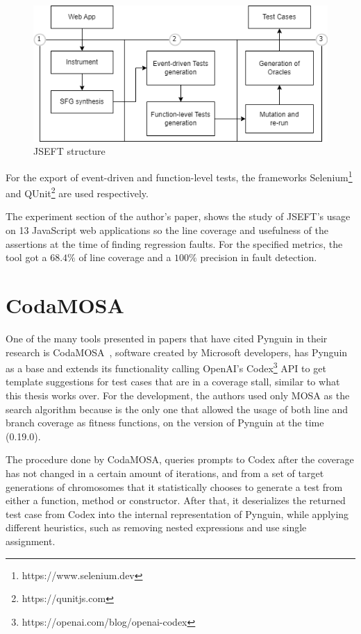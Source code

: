 \documentclass[%
  chapterprefix=false,%
  open=right,%
  twoside=true,%
  paper=a4,%
  logofile={Figures/logo.png},%
  thesistype=master,%
  UKenglish,%
]{se2thesis}
\begin{document}
\begin{figure}[tb]
  \centering 
  \includegraphics[width=.99\textwidth]{Figures/jseft2.png}
  \caption{JSEFT structure}\label{fig:jseft}
\end{figure}

For the export of event-driven and function-level tests, the frameworks Selenium\footnote{https://www.selenium.dev} and QUnit\footnote{https://qunitjs.com} are used respectively.

The experiment section of the author's paper, shows the study of JSEFT's usage on 13 JavaScript web applications so the line coverage and usefulness of the assertions at the time of finding regression faults.
For the specified metrics, the tool got a \(68.4\%\) of line coverage and a \(100\%\) precision in fault detection.

\section{CodaMOSA}

One of the many tools presented in papers that have cited Pynguin in their research is CodaMOSA~\cite{DBLP:conf/icse/LemieuxILS23}, software created by Microsoft developers, has Pynguin as a base and extends its functionality calling OpenAI's Codex\footnote{https://openai.com/blog/openai-codex} API to get template suggestions for test cases that are in a coverage stall, similar to what this thesis works over.
For the development, the authors used only MOSA as the search algorithm because is the only one that allowed the usage of both line and branch coverage as fitness functions, on the version of Pynguin at the time (0.19.0).

The procedure done by CodaMOSA, queries prompts to Codex after the coverage has not changed in a certain amount of iterations, and from a set of target generations of chromosomes that it statistically chooses to generate a test from either a function, method or constructor.
After that, it deserializes the returned test case from Codex into the internal representation of Pynguin, while applying different heuristics, such as removing nested expressions and use single assignment.
\end{document}
